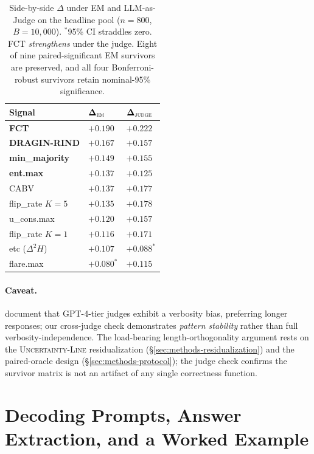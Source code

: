 \documentclass[11pt]{article}
\begin{document}
\begin{table}[h]
\centering\small
\begin{tabular}{@{}lll@{}}
\toprule
\textbf{Signal} & $\boldsymbol{\Delta}_{\textsc{em}}$ & $\boldsymbol{\Delta}_{\textsc{judge}}$ \\
\midrule
\textbf{FCT}              & $+0.190$         & $\mathbf{+0.222}$ \\
\textbf{DRAGIN-RIND}      & $+0.167$         & $+0.157$ \\
\textbf{min\_majority}    & $+0.149$         & $+0.155$ \\
\textbf{ent.max}          & $+0.137$         & $+0.125$ \\
CABV                      & $+0.137$         & $+0.177$ \\
flip\_rate $K{=}5$        & $+0.135$         & $+0.178$ \\
u\_cons.max               & $+0.120$         & $+0.157$ \\
flip\_rate $K{=}1$        & $+0.116$         & $+0.171$ \\
etc ($\Delta^2 H$)        & $+0.107$         & $+0.088^{\ast}$ \\
flare.max                 & $+0.080^{\ast}$  & $+0.115$ \\
\bottomrule
\end{tabular}
\caption{Side-by-side $\Delta$ under EM and LLM-as-Judge on the headline pool ($n{=}800$, $B{=}10{,}000$). $^{\ast}$95\% CI straddles zero. FCT \emph{strengthens} under the judge. Eight of nine paired-significant EM survivors are preserved, and all four Bonferroni-robust survivors retain nominal-95\% significance.}
\label{tab:llmjudge}
\end{table}

\paragraph{Caveat.} \citet{zheng_judging_2023} document that GPT-4-tier judges exhibit a verbosity bias, preferring longer responses; our cross-judge check demonstrates \emph{pattern stability} rather than full verbosity-independence. The load-bearing length-orthogonality argument rests on the \textsc{Uncertainty-Line} residualization (\S\ref{sec:methods-residualization}) and the paired-oracle design (\S\ref{sec:methods-protocol}); the judge check confirms the survivor matrix is not an artifact of any single correctness function.


\section{Decoding Prompts, Answer Extraction, and a Worked Example}
\label{sec:appendix-prompts}
\end{document}
